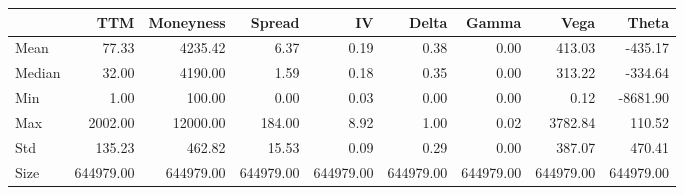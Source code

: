 \begin{tabular}{lrrrrrrrr}
\toprule
 & TTM & Moneyness & Spread & IV & Delta & Gamma & Vega & Theta \\
\midrule
Mean & 77.33 & 4235.42 & 6.37 & 0.19 & 0.38 & 0.00 & 413.03 & -435.17 \\
Median & 32.00 & 4190.00 & 1.59 & 0.18 & 0.35 & 0.00 & 313.22 & -334.64 \\
Min & 1.00 & 100.00 & 0.00 & 0.03 & 0.00 & 0.00 & 0.12 & -8681.90 \\
Max & 2002.00 & 12000.00 & 184.00 & 8.92 & 1.00 & 0.02 & 3782.84 & 110.52 \\
Std & 135.23 & 462.82 & 15.53 & 0.09 & 0.29 & 0.00 & 387.07 & 470.41 \\
Size & 644979.00 & 644979.00 & 644979.00 & 644979.00 & 644979.00 & 644979.00 & 644979.00 & 644979.00 \\
\bottomrule
\end{tabular}

